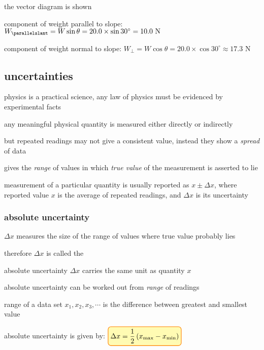 \label{ex:comp-of-W}

\sol the vector diagram is shown

component of weight parallel to slope: $W_\parallelslant = W\sin\theta = 20.0\times \sin30^\circ = 10.0 \text{ N}$

component of weight normal to slope: $W_\perp = W\cos\theta = 20.0\times \cos30^\circ \approx 17.3 \text{ N}$ \eoe


 
\subsection{uncertainties}
 
physics is a practical science, any law of physics must be evidenced by experimental facts

any meaningful physical quantity is measured either directly or indirectly

but repeated readings may not give a consistent value, instead they show a \emph{spread} of data

 gives the \emph{range} of values in which \emph{true value} of the measurement is asserted to lie

measurement of a particular quantity is usually reported as $x \pm \Delta x$, where reported value $x$ is the average of repeated readings, and $\Delta x$ is its uncertainty

\subsubsection{absolute uncertainty}

$\Delta x$ measures the size of the range of values where true value probably lies

therefore $\Delta x$ is called the 

\cmt absolute uncertainty $\Delta x$ carries the same unit as quantity $x$

\cmt absolute uncertainty can be worked out from \emph{range} of readings

range of a data set ${x_1, x_2, x_3, \cdots}$ is the difference between greatest and smallest value

absolute uncertainty is given by: $\boxed{\Delta x = \frac{1}{2}\left(x_\tmax-x_\tmin\right)}$

